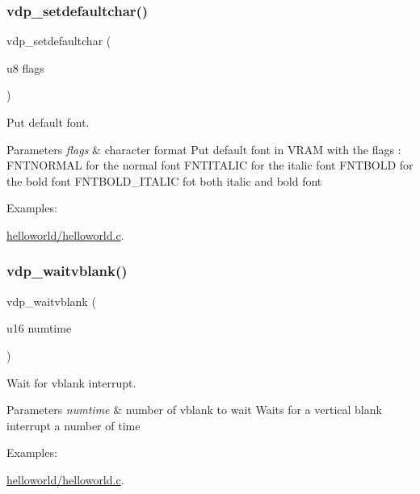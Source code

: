\subsubsection{\texorpdfstring{vdp\+\_\+setdefaultchar()}{vdp\_setdefaultchar()}}
{\footnotesize\ttfamily vdp\+\_\+setdefaultchar (\begin{DoxyParamCaption}\item[{u8}]{flags }\end{DoxyParamCaption})}



Put default font. 


\begin{DoxyParams}{Parameters}
{\em flags} & character format Put default font in V\+R\+AM with the flags \+: F\+N\+T\+N\+O\+R\+M\+AL for the normal font F\+N\+T\+I\+T\+A\+L\+IC for the italic font F\+N\+T\+B\+O\+LD for the bold font F\+N\+T\+B\+O\+L\+D\+\_\+\+I\+T\+A\+L\+IC fot both italic and bold font \\
\hline
\end{DoxyParams}
\begin{Desc}
\item[Examples\+: ]\par
\hyperlink{a00060}{helloworld/helloworld.\+c}.\end{Desc}
\mbox{\label{a00053_a83dfd82e385330c883c67c30137f9857}} 
\subsubsection{\texorpdfstring{vdp\+\_\+waitvblank()}{vdp\_waitvblank()}}
{\footnotesize\ttfamily vdp\+\_\+waitvblank (\begin{DoxyParamCaption}\item[{u16}]{numtime }\end{DoxyParamCaption})}



Wait for vblank interrupt. 


\begin{DoxyParams}{Parameters}
{\em numtime} & number of vblank to wait Waits for a vertical blank interrupt a number of time \\
\hline
\end{DoxyParams}
\begin{Desc}
\item[Examples\+: ]\par
\hyperlink{a00060}{helloworld/helloworld.\+c}.\end{Desc}
